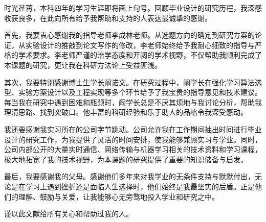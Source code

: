 
\begin{acknowledgements}
时光荏苒，本科四年的学习生涯即将画上句号。回顾毕业设计的研究历程，我深感收获良多，在此向所有给予我帮助和支持的人表达最诚挚的感谢。

首先，我要衷心感谢我的指导老师李成林老师。从选题方向的确定到研究方案的论证，从实验设计的推敲到论文写作的修改，李老师始终给予我耐心细致的指导与严格的学术要求。李老师严谨的治学态度和开阔的学术视野，不仅帮助我顺利完成了本课题的研究，更让我在科研方法论上受益匪浅。

其次，我要特别感谢博士生学长阚诺文。在研究过程中，阚学长在强化学习算法选型、实验方案设计以及工程实现等多个环节给予了我宝贵的指导意见和技术建议。每当我在研究中遇到困难和瓶颈时，阚学长总是不厌其烦地与我讨论分析，帮助我理清思路、找到突破口。他丰富的科研经验和乐于助人的品格令我深受感动。

我还要感谢我实习所在的公司字节跳动。公司允许我在工作期间抽出时间进行毕业设计的研究工作，为我提供了灵活的时间安排，使我能够兼顾实习与学业。同时，公司内部公开的大量实时通信、网络传输与机器学习相关的技术资料和学习课程，极大地拓宽了我的技术视野，为本课题的研究提供了重要的知识储备与启发。

最后，我要感谢我的父母。感谢他们多年来对我学业的无条件支持与默默付出，无论是在学习上遇到挫折还是面临人生选择时，他们始终是我最坚实的后盾。正是他们的理解、鼓励与关爱，让我能够心无旁骛地投入学业和研究之中。

谨以此文献给所有关心和帮助过我的人。
\end{acknowledgements}
